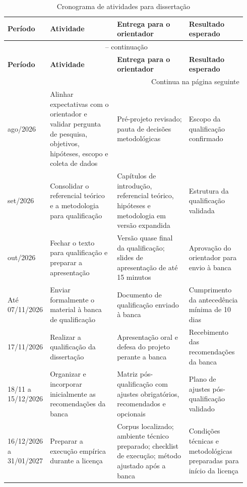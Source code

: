 \begin{landscape}
\begingroup
\small
\setlength{\tabcolsep}{4pt}
\renewcommand{\arraystretch}{1.15}
\begin{longtable}{p{0.12\linewidth}p{0.28\linewidth}p{0.30\linewidth}p{0.24\linewidth}}
\caption{Cronograma de atividades para dissertação}\label{tab:cronograma}\\
\toprule
\textbf{Período} & \textbf{Atividade} & \textbf{Entrega para o orientador} & \textbf{Resultado esperado} \\
\midrule
\endfirsthead
\multicolumn{4}{c}{\tablename~\thetable{} -- continuação}\\
\toprule
\textbf{Período} & \textbf{Atividade} & \textbf{Entrega para o orientador} & \textbf{Resultado esperado} \\
\midrule
\endhead
\midrule
\multicolumn{4}{r}{Continua na página seguinte}\\
\endfoot
\bottomrule
\endlastfoot
ago/2026 & Alinhar expectativas com o orientador e validar pergunta de pesquisa, objetivos, hipóteses, escopo e coleta de dados & Pré-projeto revisado; pauta de decisões metodológicas & Escopo da qualificação confirmado \\
set/2026 & Consolidar o referencial teórico e a metodologia para qualificação & Capítulos de introdução, referencial teórico, hipóteses e metodologia em versão expandida & Estrutura da qualificação validada \\
out/2026 & Fechar o texto para qualificação e preparar a apresentação & Versão quase final da qualificação; slides de apresentação de até 15 minutos & Aprovação do orientador para envio à banca \\
Até 07/11/2026 & Enviar formalmente o material à banca de qualificação & Documento de qualificação enviado à banca & Cumprimento da antecedência mínima de 10 dias \\
17/11/2026 & Realizar a qualificação da dissertação & Apresentação oral e defesa do projeto perante a banca & Recebimento das recomendações da banca \\
18/11 a 15/12/2026 & Organizar e incorporar inicialmente as recomendações da banca & Matriz pós-qualificação com ajustes obrigatórios, recomendados e opcionais & Plano de ajustes pós-qualificação validado \\
16/12/2026 a 31/01/2027 & Preparar a execução empírica durante a licença & Corpus localizado; ambiente técnico preparado; checklist de execução; método ajustado após a banca & Condições técnicas e metodológicas preparadas para início da licença \\

\end{longtable}
\end{landscape}
